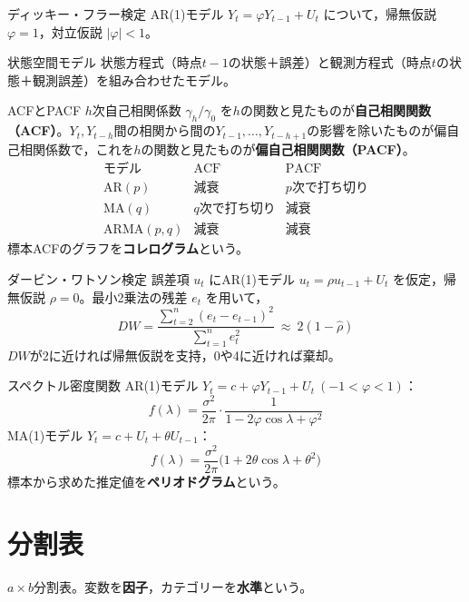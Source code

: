 \documentclass[a4paper,11pt]{ltjsarticle}
\begin{document}
\begin{term}{ディッキー・フラー検定}
AR(1)モデル $Y_t=\varphi Y_{t-1}+U_t$ について，帰無仮説 $\varphi=1$，対立仮説 $|\varphi|<1$。
\end{term}

\begin{term}{状態空間モデル}
状態方程式（時点$t-1$の状態＋誤差）と観測方程式（時点$t$の状態＋観測誤差）を組み合わせたモデル。
\end{term}

\begin{term}{ACFとPACF}
$h$次自己相関係数 $\gamma_h/\gamma_0$ を$h$の関数と見たものが\textbf{自己相関関数（ACF）}。$Y_t,Y_{t-h}$間の相関から間の$Y_{t-1},\dots,Y_{t-h+1}$の影響を除いたものが偏自己相関係数で，これを$h$の関数と見たものが\textbf{偏自己相関関数（PACF）}。
\[
\begin{array}{lcc}
\text{モデル} & \text{ACF} & \text{PACF}\\\hline
\text{AR}(p) & \text{減衰} & p\text{次で打ち切り}\\
\text{MA}(q) & q\text{次で打ち切り} & \text{減衰}\\
\text{ARMA}(p,q) & \text{減衰} & \text{減衰}
\end{array}
\]
標本ACFのグラフを\textbf{コレログラム}という。
\end{term}

\begin{term}{ダービン・ワトソン検定}
誤差項 $u_t$ にAR(1)モデル $u_t=\rho u_{t-1}+U_t$ を仮定，帰無仮説 $\rho=0$。最小2乗法の残差 $e_t$ を用いて，
\[
DW = \frac{\sum_{t=2}^n (e_t-e_{t-1})^2}{\sum_{t=1}^n e_t^2} \ \approx\ 2(1-\hat\rho)
\]
$DW$が2に近ければ帰無仮説を支持，0や4に近ければ棄却。
\end{term}

\begin{term}{スペクトル密度関数}
AR(1)モデル $Y_t=c+\varphi Y_{t-1}+U_t\ (-1<\varphi<1)$：
\[
f(\lambda) = \frac{\sigma^2}{2\pi}\cdot\frac{1}{1-2\varphi\cos\lambda+\varphi^2}
\]
MA(1)モデル $Y_t=c+U_t+\theta U_{t-1}$：
\[
f(\lambda) = \frac{\sigma^2}{2\pi}\big(1+2\theta\cos\lambda+\theta^2\big)
\]
標本から求めた推定値を\textbf{ペリオドグラム}という。
\end{term}

\section{分割表}

$a\times b$分割表。変数を\textbf{因子}，カテゴリーを\textbf{水準}という。
\end{document}
